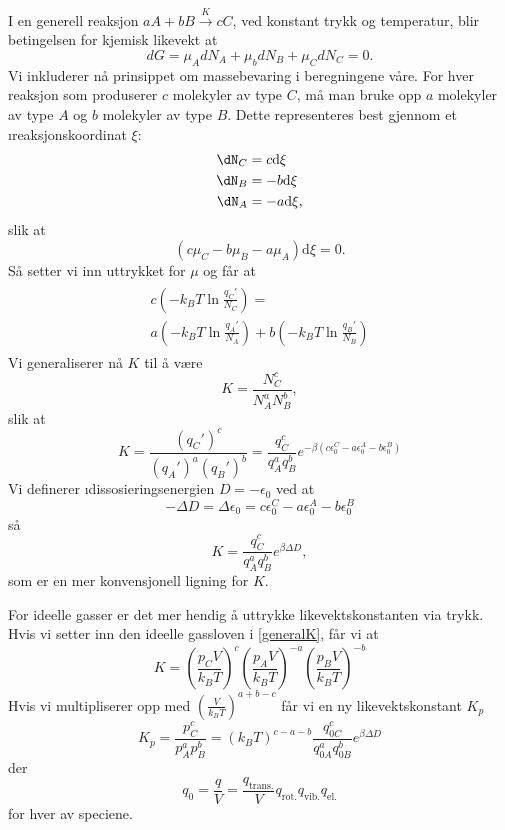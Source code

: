 I en generell reaksjon $aA+bB\xrightarrow{K}cC$, ved konstant trykk og temperatur, blir betingelsen for kjemisk likevekt at 
\begin{equation}
	dG=\mu_AdN_A+\mu_bdN_B+\mu_CdN_C=0.
\end{equation}
Vi inkluderer nå prinsippet om massebevaring i beregningene våre. For hver reaksjon som produserer $c$ molekyler av type $C$, må man bruke opp $a$ molekyler av type $A$ og $b$ molekyler av type $B$. Dette representeres best gjennom et \i{reaksjonskoordinat} $\xi$: 
\begin{align}
	\dN_C&=c\text{d}\xi \\
	\dN_B&=-b\text{d}\xi \\ 
	\dN_A&=-a\text{d}\xi,
\end{align}
slik at 
\begin{equation}
	(c\mu_C-b\mu_B-a\mu_A)\text{d}\xi=0.	
\end{equation}
Så setter vi inn uttrykket for $\mu$ og får at
\begin{align}
\begin{split}
	c\left(-k_BT\ln\frac{q_C'}{N_C}\right)= \\ a\left(-k_BT\ln\frac{q_A'}{N_A}\right)+b\left(-k_BT\ln\frac{q_B'}{N_B}\right)
\end{split}
\end{align}
Vi generaliserer nå $K$ til å være
\begin{equation}
	\label{generalK}
	K=\frac{N_C^c}{N_A^aN_B^b},
\end{equation}
slik at
\begin{equation}
	K=\frac{(q_C')^c}{(q_A')^a(q_B')^b}=\frac{q_C^c}{q_A^aq_B^b}e^{-\beta(c\epsilon_0^C-a\epsilon_0^A-b\epsilon_0^B)}
\end{equation}
Vi definerer \i{dissosieringsenergien} $D=-\epsilon_0$ ved at 
\begin{equation}
	-\Delta D=\Delta \epsilon_0 = c\epsilon_0^C-a\epsilon_0^A-b\epsilon_0^B
\end{equation}
så
\begin{equation}
	K=\frac{q_C^c}{q_A^aq_B^b}e^{\beta\Delta D},
\end{equation}
som er en mer konvensjonell ligning for $K$.

For ideelle gasser er det mer hendig å uttrykke likevektskonstanten via trykk. Hvis vi setter inn den ideelle gassloven i \eqref{generalK}, får vi at
\begin{equation}
	K=\left(\frac{p_CV}{k_BT}\right)^c\left(\frac{p_AV}{k_BT}\right)^{-a}\left(\frac{p_BV}{k_BT}\right)^{-b}
\end{equation}
Hvis vi multipliserer opp med $\left(\frac{V}{k_BT}\right)^{a+b-c}$ får vi en ny likevektskonstant $K_p$
\begin{equation}
	K_p=\frac{p_C^c}{p_A^ap_B^b}=(k_BT)^{c-a-b}\frac{q_{0C}^c}{q_{0A}^aq_{0B}^b}e^{\beta\Delta D}
\end{equation}
der
\begin{equation}
	q_0=\frac{q}{V}=\frac{q_{\text{trans.}}}{V}q_{\text{rot.}}q_{\text{vib.}}q_{\text{el.}}
\end{equation}
for hver av speciene.

